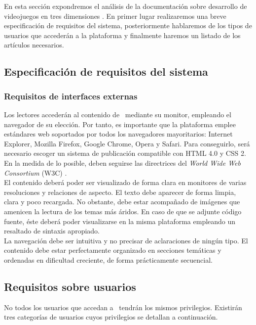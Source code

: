 En esta sección expondremos el análisis de la documentación sobre desarrollo
de videojuegos en tres dimensiones \wiki. En primer lugar realizaremos
una breve especificación de requisitos del sistema, posteriormente
hablaremos de los tipos de usuarios que accederán a la plataforma y finalmente
haremos un listado de los artículos necesarios.\\

\subsection{Especificación de requisitos del sistema}

\subsubsection{Requisitos de interfaces externas}

Los lectores accederán al contenido de \wiki\ mediante su monitor, empleando
el navegador de su elección. Por tanto, es importante que la plataforma emplee
estándares web soportados por todos los navegadores mayoritarios: Internet
Explorer, Mozilla Firefox, Google Chrome, Opera y Safari. Para conseguirlo,
será necesario escoger un sistema de publicación compatible con HTML 4.0
y CSS 2. En la medida de lo posible, deben seguirse las directrices del
\textit{World Wide Web Consortium} (W3C) \cite{website:w3c}.\\

El contenido deberá poder ser visualizado de forma clara en monitores
de varias resoluciones y relaciones de aspecto. El texto debe aparecer
de forma limpia, clara y poco recargada. No obstante, debe estar acompañado
de imágenes que amenicen la lectura de los temas más áridos. En caso de
que se adjunte código fuente, éste deberá poder visualizarse en la misma
plataforma empleando un resaltado de sintaxis apropiado.\\

La navegación debe ser intuitiva y no precisar de aclaraciones de ningún tipo.
El contenido debe estar perfectamente organizado en secciones temáticas
y ordenadas en dificultad creciente, de forma prácticamente secuencial.\\

\subsection{Requisitos sobre usuarios}

No todos los usuarios que accedan a \wiki\ tendrán los mismos privilegios.
Existirán tres categorías de usuarios cuyos privilegios se detallan a
continuación.\\

